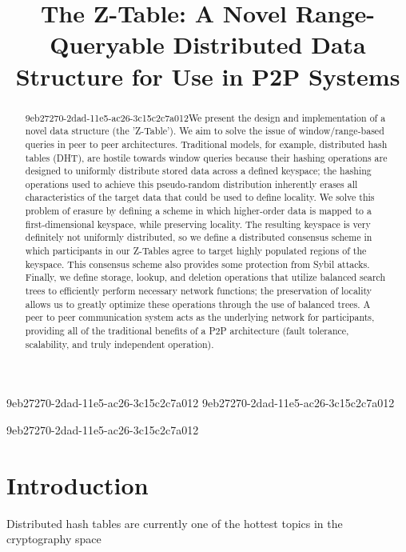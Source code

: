\documentclass[12pt]{article}
\title{The Z-Table: A Novel Range-Queryable Distributed Data Structure for Use in P2P Systems}
\begin{document}
9eb27270-2dad-11e5-ac26-3c15c2c7a012
9eb27270-2dad-11e5-ac26-3c15c2c7a012\maketitle

\begin{abstract}
9eb27270-2dad-11e5-ac26-3c15c2c7a012We present the design and implementation of a novel data structure (the 'Z-Table'). We aim to solve the issue of window/range-based queries in peer to peer architectures. Traditional models, for example,  distributed hash tables (DHT), are hostile towards window queries because their hashing operations are designed to uniformly distribute stored data across a defined keyspace; the hashing operations used to achieve this pseudo-random distribution inherently erases all characteristics of the target data that could be used to define locality. We solve this problem of erasure by defining a scheme in which higher-order data is mapped to a first-dimensional keyspace, while preserving locality. The resulting keyspace is very definitely not uniformly distributed, so we define a distributed consensus scheme in which participants in our Z-Tables agree to target highly populated regions of the keyspace. This consensus scheme also provides some protection from Sybil attacks. Finally, we define storage, lookup, and deletion operations that utilize balanced search trees to efficiently perform necessary network functions; the preservation of locality allows us to greatly optimize these operations through the use of balanced trees. A peer to peer communication system acts as the underlying network for participants, providing all of the traditional benefits of a P2P architecture (fault tolerance, scalability, and truly independent operation).
\end{abstract}
9eb27270-2dad-11e5-ac26-3c15c2c7a012

\newpage
\section{Introduction}
Distributed hash tables are currently one of the hottest topics in the cryptography space~\cite{Stoica:2001dj,Rowstron:2001ea,Ratnasamy:2001wn}

\printbibliography
\end{document}
